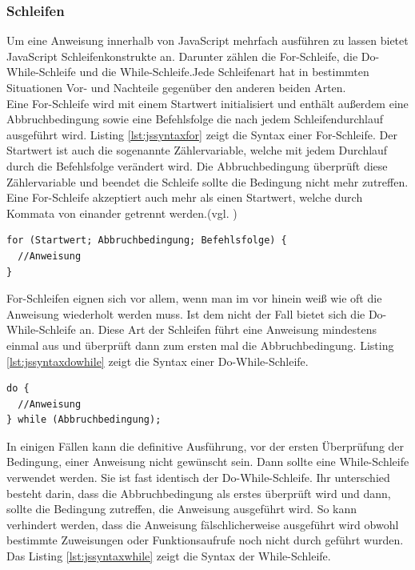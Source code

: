 \subsubsection{Schleifen} Um eine Anweisung innerhalb von JavaScript mehrfach ausführen zu lassen bietet JavaScript Schleifenkonstrukte an. Darunter zählen die For-Schleife, die Do-While-Schleife und die While-Schleife.Jede Schleifenart hat in bestimmten Situationen Vor- und Nachteile gegenüber den anderen beiden Arten.\\Eine For-Schleife wird mit einem Startwert initialisiert und enthält außerdem eine Abbruchbedingung sowie eine Befehlsfolge die nach jedem Schleifendurchlauf ausgeführt wird. Listing \ref{lst:jssyntaxfor} zeigt die Syntax einer For-Schleife. Der Startwert ist auch die sogenannte Zählervariable, welche mit jedem Durchlauf durch die Befehlsfolge verändert wird. Die Abbruchbedingung überprüft diese Zählervariable und beendet die Schleife sollte die Bedingung nicht mehr zutreffen. Eine For-Schleife akzeptiert auch mehr als einen Startwert, welche durch Kommata von einander getrennt werden.(vgl. \cite[S.75f]{WenzJava2008})

	\vspace{1em}
	\begin{lstlisting}[frame=htrbl, caption=Syntax For-Schleife, label=lst:jssyntaxfor]
for (Startwert; Abbruchbedingung; Befehlsfolge) {
  //Anweisung
}
	\end{lstlisting}
	
For-Schleifen eignen sich vor allem, wenn man im vor hinein weiß wie oft die Anweisung wiederholt werden muss. Ist dem nicht der Fall bietet sich die Do-While-Schleife an. Diese Art der Schleifen führt eine Anweisung mindestens einmal aus und überprüft dann zum ersten mal die Abbruchbedingung. Listing \ref{lst:jssyntaxdowhile} zeigt die Syntax einer Do-While-Schleife.

	\vspace{1em}
	\begin{lstlisting}[frame=htrbl, caption=Syntax Do-While-Schleife, label=lst:jssyntaxdowhile]
do {
  //Anweisung
} while (Abbruchbedingung);
	\end{lstlisting}

In einigen Fällen kann die definitive Ausführung, vor der ersten Überprüfung der Bedingung, einer Anweisung nicht gewünscht sein. Dann sollte eine While-Schleife verwendet werden. Sie ist fast identisch der Do-While-Schleife. Ihr unterschied besteht darin, dass die Abbruchbedingung als erstes überprüft wird und dann, sollte die Bedingung zutreffen, die Anweisung ausgeführt wird. So kann verhindert werden, dass die Anweisung fälschlicherweise ausgeführt wird obwohl bestimmte Zuweisungen oder Funktionsaufrufe noch nicht durch geführt wurden. Das Listing \ref{lst:jssyntaxwhile} zeigt die Syntax der While-Schleife.

